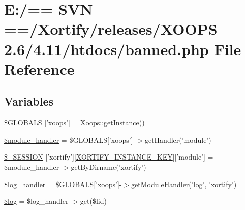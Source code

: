 \hypertarget{banned_8php}{\section{E\-:/== S\-V\-N ==/\-Xortify/releases/\-X\-O\-O\-P\-S 2.6/4.11/htdocs/banned.php File Reference}
\label{banned_8php}
}
\subsection*{Variables}
\begin{DoxyCompactItemize}
\item 
\hyperlink{banned_8php_ad10934112c0d18cf6b358d47afa6fcf1}{\$\-G\-L\-O\-B\-A\-L\-S} \mbox{[}'xoops'\mbox{]} = Xoops\-::get\-Instance()
\item 
\hyperlink{banned_8php_afe9169534dbc3935c0823c21cfbf68bb}{\$module\-\_\-handler} = \$G\-L\-O\-B\-A\-L\-S\mbox{[}'xoops'\mbox{]}-\/$>$get\-Handler('module')
\item 
\hyperlink{banned_8php_abe1e967dbf87a7b078bc37e6b4803e04}{\$\-\_\-\-S\-E\-S\-S\-I\-O\-N} \mbox{[}'xortify'\mbox{]}\mbox{[}\hyperlink{instance_8php_ad4a865d4289ea8a5a0454b65e7ea47c7}{X\-O\-R\-T\-I\-F\-Y\-\_\-\-I\-N\-S\-T\-A\-N\-C\-E\-\_\-\-K\-E\-Y}\mbox{]}\mbox{[}'module'\mbox{]} = \$module\-\_\-handler-\/$>$get\-By\-Dirname('xortify')
\item 
\hyperlink{banned_8php_a57087b1c7fc5b4ecf0edf917f6c40b71}{\$log\-\_\-handler} = \$G\-L\-O\-B\-A\-L\-S\mbox{[}'xoops'\mbox{]}-\/$>$get\-Module\-Handler('log', 'xortify')
\item 
\hyperlink{banned_8php_a9a2cf15a653aee8be437f7ae474cd494}{\$log} = \$log\-\_\-handler-\/$>$get(\$lid)
\end{DoxyCompactItemize}


